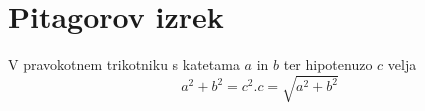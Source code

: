 \documentclass{article}
\begin{document}
\section*{Pitagorov izrek}
V pravokotnem trikotniku s katetama \(a\) in \(b\) ter hipotenuzo \(c\) velja
\[ a^2 + b^2 = c^2.        c = \sqrt{a^2 + b^2}\]
\end{document}
